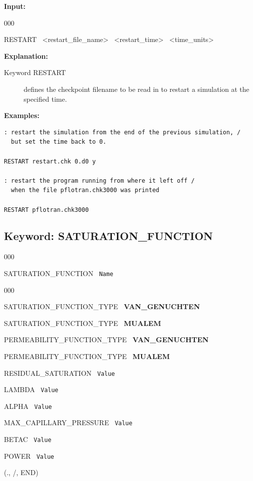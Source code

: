 \documentclass[12pt]{article}
\begin{document}
{\noindent\bf Input:}

\begin{deflist}{000}
\item[RESTART] \ <restart\_file\_name> \ <restart\_time> \ <time\_units>
\end{deflist}

{\noindent\bf Explanation:}
\begin{description}
\item[Keyword RESTART] defines the checkpoint filename to be read in to restart a simulation at the specified time.
\end{description}

{\noindent\bf
Examples:}

\begin{verbatim}
: restart the simulation from the end of the previous simulation, /
  but set the time back to 0.

RESTART restart.chk 0.d0 y

: restart the program running from where it left off /
  when the file pflotran.chk3000 was printed

RESTART pflotran.chk3000

\end{verbatim}


\newpage
\protect\hypertarget{target_sat}{}

\subsection{Keyword: SATURATION\_FUNCTION}


\begin{deflist}{000}
\item[SATURATION\_FUNCTION] \ {\tt Name}

\begin{deflist}{000}
\item[SATURATION\_FUNCTION\_TYPE] \ {\bf VAN\_GENUCHTEN}
\item[SATURATION\_FUNCTION\_TYPE] \ {\bf MUALEM}
\item[PERMEABILITY\_FUNCTION\_TYPE] \ {\bf VAN\_GENUCHTEN}
\item[PERMEABILITY\_FUNCTION\_TYPE] \ {\bf MUALEM}
\item[RESIDUAL\_SATURATION] \ {\tt Value}
\item[LAMBDA] \ {\tt Value}
\item[ALPHA] \ {\tt Value}
\item[MAX\_CAPILLARY\_PRESSURE] \ {\tt Value}
\item[BETAC] \ {\tt Value}
\item[POWER] \ {\tt Value}
\end{deflist}
\item[(., /, END)]
\end{deflist}
\end{document}
